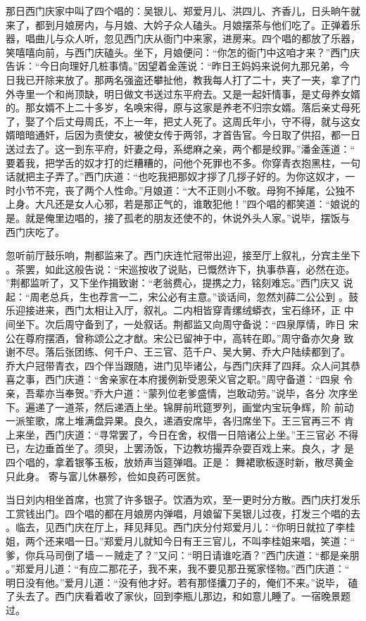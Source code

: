 那日西门庆家中叫了四个唱的：吴银儿、郑爱月儿、洪四儿、齐香儿，日头晌午就
来了，都到月娘房内，与月娘、大妗子众人磕头。月娘摆茶与他们吃了。正弹着乐
器，唱曲儿与众人听，忽见西门庆从衙门中来家，进房来。四个唱的都放了乐器，
笑嘻嘻向前，与西门庆磕头。坐下，月娘便问：“你怎的衙门中这咱才来？”西门庆
告诉：“今日向理好几桩事情。”因望着金莲说：“昨日王妈妈来说何九那兄弟，今
日我已开除来放了。那两名强盗还攀扯他，教我每人打了二十，夹了一夹，拿了门
外寺里一个和尚顶缺，明日做文书送过东平府去。又是一起奸情事，是丈母养女婿
的。那女婿不上二十多岁，名唤宋得，原与这家是养老不归宗女婿。落后亲丈母死
了，娶了个后丈母周氏，不上一年，把丈人死了。这周氏年小，守不得，就与这女
婿暗暗通奸，后因为责使女，被使女传于两邻，才首告官。今日取了供招，都一日
送过去了。这一到东平府，奸妻之母，系缌麻之亲，两个都是绞罪。”潘金莲道：“
要着我，把学舌的奴才打的烂糟糟的，问他个死罪也不多。你穿青衣抱黑柱，一句
话就把主子弄了。”西门庆道：“也吃我把那奴才拶了几拶子好的。为你这奴才，一
时小节不完，丧了两个人性命。”月娘道：“大不正则小不敬。母狗不掉尾，公独不
上身。大凡还是女人心邪，若是那正气的，谁敢犯他！”四个唱的都笑道：“娘说的
是。就是俺里边唱的，接了孤老的朋友还使不的，休说外头人家。”说毕，摆饭与
西门庆吃了。

忽听前厅鼓乐响，荆都监来了。西门庆连忙冠带出迎，接至厅上叙礼，分宾主坐下
。茶罢，如此这般告说：“宋巡按收了说贴，已慨然许下，执事恭喜，必然在迩。
”荆都监听了，又下坐作揖致谢：“老翁费心，提携之力，铭刻难忘。”西门庆又
说起：“周老总兵，生也荐言一二，宋公必有主意。”谈话间，忽然刘薛二公公到
。鼓乐迎接进来，西门太相让入厅，叙礼。二内相皆穿青缧绒蟒衣，宝石绦环，正
中间坐下。次后周守备到了，一处叙话。荆都监又向周守备说：“四泉厚情，昨日
宋公在尊府摆酒，曾称颂公之才猷。宋公已留神于中，高转在即。”周守备亦欠身
致谢不尽。落后张团练、何千户、王三官、范千户、吴大舅、乔大户陆续都到了。
乔大户冠带青衣，四个伴当跟随，进门见毕诸公，与西门庆拜了四拜。众人问其恭
喜之事，西门庆道：“舍亲家在本府援例新受恩荣义官之职。”周守备道：“四泉
令亲，吾辈亦当奉贺。”乔大户道：“蒙列位老爹盛情，岂敢动劳。”说毕，各分
次序坐下。遍递了一道茶，然后递酒上坐。锦屏前玳筵罗列，画堂内宝玩争辉，阶
前动一派笙歌，席上堆满盘异果。良久，递酒安席毕，各归席坐下。王三官再三不
肯上来坐，西门庆道：“寻常罢了，今日在舍，权借一日陪诸公上坐。”王三官必
不得已，左边垂首坐了。须臾，上罢汤饭，下边教坊撮弄杂耍百戏上来。良久，才
是四个唱的，拿着银筝玉板，放娇声当筵弹唱。正是：
舞裙歌板逐时新，散尽黄金只此身。
寄与富儿休暴殄，俭如良药可医贫。

当日刘内相坐首席，也赏了许多银子。饮酒为欢，至一更时分方散。西门庆打发乐
工赏钱出门。四个唱的都在月娘房内弹唱，月娘留下吴银儿过夜，打发三个唱的去
。临去，见西门庆在厅上，拜见拜见。西门庆分付郑爱月儿：“你明日就拉了李桂
姐，两个还来唱一日。”郑爱月儿就知今日有王三官儿，不叫李桂姐来唱，笑道：“
爹，你兵马司倒了墙－－贼走了？”又问：“明日请谁吃酒？”西门庆道：“都是亲朋
。”郑爱月儿道：“有应二那花子，我不来，我不要见那丑冤家怪物。”西门庆道：“
明日没有他。”爱月儿道：“没有他才好。若有那怪攮刀子的，俺们不来。”说毕，
磕了头去了。西门庆看着收了家伙，回到李瓶儿那边，和如意儿睡了。一宿晚景题
过。


